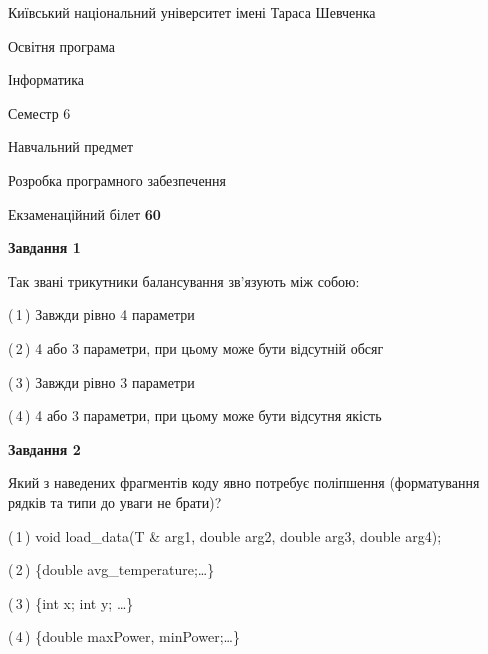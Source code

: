 \documentclass[10pt, ukrainian]{article}
\begin{document}
{{\begin {small}\par
{ \center  Київський національний університет імені Тараса Шевченка \par}
{\parbox {5 cm}{Освітня програма \hfill}{\parbox {7 cm}{Інформатика \hfill}}\parbox {6 cm}{\hfill Семестр 6}}\par
{\parbox {5 cm} {Навчальний предмет \hfill}\parbox {7 cm}{Розробка програмного забезпечення \hfill}\parbox {6cm}{\hfill}\par}\vspace{-7pt} \end{small}}{\center Екзаменаційний білет \No \textbf
{ 60 }\par}}
{
\begin {large}
{\begin {center}\textbf{Завдання 1}\end {center}}\par
Так звані трикутники балансування зв'язують між собою:\par
\vspace{2mm}



(\,1\,) Завжди рівно 4 параметри%



(\,2\,) 4 або 3 параметри, при цьому може бути відсутній обсяг %



(\,3\,) Завжди рівно 3 параметри%



(\,4\,) 4 або 3 параметри, при цьому може бути відсутня якість%


{\begin {center}\textbf{Завдання 2}\end {center}}\par
Який з наведених фрагментів коду явно потребує поліпшення (форматування рядків та типи до уваги не брати)?\par
\vspace{2mm}



(\,1\,) void load\_data(T \& arg1, double arg2, double arg3, double arg4); %



(\,2\,) \{double avg\_temperature;…\} %



(\,3\,) \{int x; int y; …\}%



(\,4\,) \{double maxPower, minPower;…\} %



\end{large}}
\end{document}
